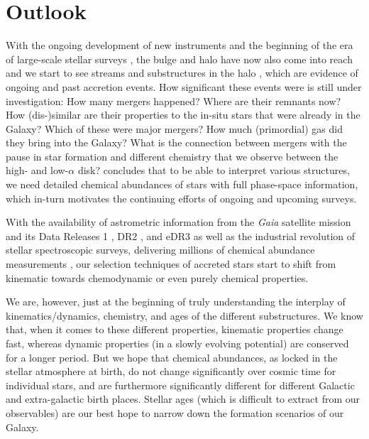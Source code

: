 \documentclass[fleqn,usenatbib]{mnras}
\newcommand{\Gaia}{\textit{Gaia}\xspace} %
\begin{document}
\section{Outlook} \label{sec:Outlook}

With the ongoing development of new instruments and the beginning of the era of large-scale stellar surveys \citep[see][for reviews]{Nissen2018, Jofre2019}, the bulge and halo have now also come into reach and we start to see streams and substructures in the halo \citep[see e.g.][for a review]{Helmi2020}, which are evidence of ongoing and past accretion events. How significant these events were is still under investigation: How many mergers happened? Where are their remnants now? How (dis-)similar are their properties to the in-situ stars that were already in the Galaxy? Which of these were major mergers? How much (primordial) gas did they bring into the Galaxy? What is the connection between mergers with the pause in star formation and different chemistry that we observe between the high- and low-$\alpha$ disk? \citet{Helmi2020} concludes that to be able to interpret various structures, we need detailed chemical abundances of stars with full phase-space information, which in-turn motivates the continuing efforts of ongoing and upcoming surveys.

With the availability of astrometric information from the \Gaia satellite mission and its Data Releases 1 \citep{Brown2016}, DR2 \citep{Brown2018}, and eDR3 \citep{Brown2021} as well as the industrial revolution of stellar spectroscopic surveys, delivering millions of chemical abundance measurements \cite[for a review see][]{Jofre2019}, our selection techniques of accreted stars start to shift from kinematic towards chemodynamic or even purely chemical properties.

We are, however, just at the beginning of truly understanding the interplay of kinematics/dynamics, chemistry, and ages of the different substructures. We know that, when it comes to these different properties, kinematic properties change fast, whereas dynamic properties (in a slowly evolving potential) are conserved for a longer period. But we hope that chemical abundances, as locked in the stellar atmosphere at birth, do not change significantly over cosmic time for individual stars, and are furthermore significantly different for different Galactic and extra-galactic birth places. Stellar ages (which is difficult to extract from our observables) are our best hope to narrow down the formation scenarios of our Galaxy.
\end{document}
